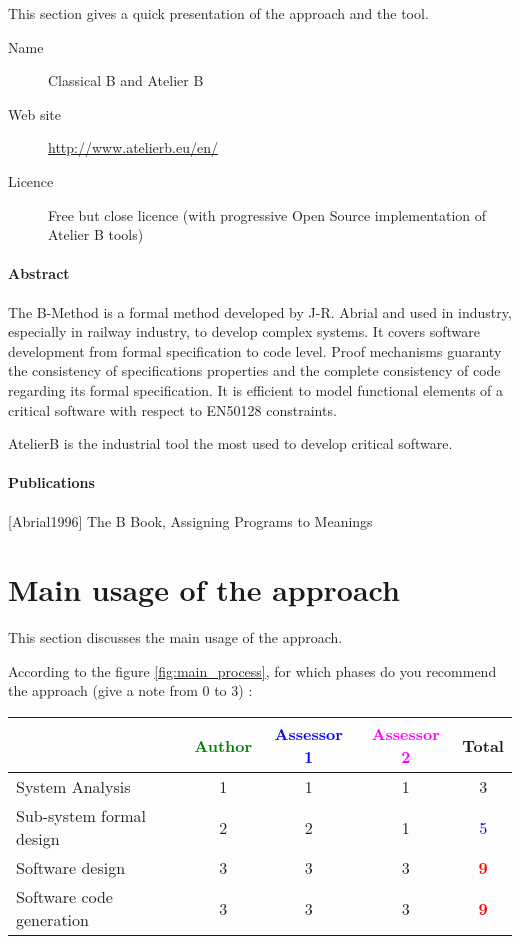 This section gives a quick presentation of the approach and the tool.

\begin{description}
\item[Name] Classical B and Atelier B
\item[Web site] \url{http://www.atelierb.eu/en/}
\item[Licence] Free but close licence (with progressive Open Source implementation of Atelier B tools)
\end{description}

\paragraph{Abstract} 

The B-Method is a formal method developed by J-R. Abrial and used in industry, especially in railway industry, to develop complex systems. It covers software development from formal specification to code level. Proof mechanisms guaranty the consistency of specifications properties and the complete consistency of code regarding its formal specification. It is efficient to model  functional  elements of a critical software with respect to  EN50128 constraints.

AtelierB is the industrial  tool the most used to develop critical software.

\paragraph{Publications} 
[Abrial1996] The B Book, Assigning Programs to Meanings


\section{Main usage of the approach}
\label{main_usage}
This section discusses the main usage of the approach.

According to the figure \ref{fig:main_process}, for which phases do you recommend the approach (give a note from 0 to  3) :

\begin{tabular}{|l | c | c | c | c|}
\hline
& \textcolor{green}{Author} & \textcolor{blue}{Assessor 1} & \textcolor{magenta}{Assessor 2} & Total \\
\hline 
System Analysis & 1     & 1     & 1     & 3     \\
\hline
Sub-system formal design & 2     & 2     & 1     & \textcolor{blue}{5} \\
\hline
Software design & 3     & 3     & 3     & \textcolor{red}{\textbf{9}} \\
\hline
Software code generation & 3     & 3     & 3     & \textcolor{red}{\textbf{9}} \\
\hline
\end{tabular}


